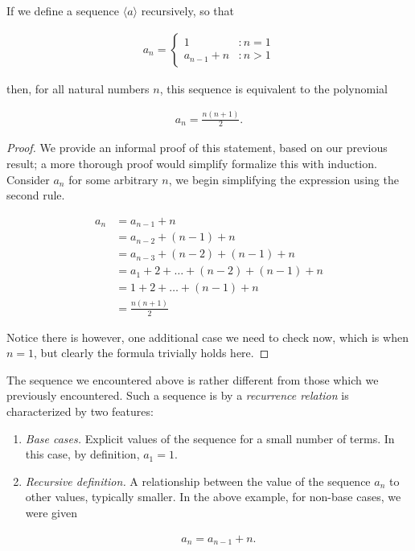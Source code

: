 \documentclass[twoside]{report}
\begin{document}
\vspace{\baselineskip}
\begin{theorem}
	If we define a sequence $\langle a \rangle$ recursively, so that
	
	\begin{align*}
		a_n =
		\begin{cases}
			1 &: n = 1 \\
			a_{n - 1} + n &: n > 1
		\end{cases}
	\end{align*}
	
	then, for all natural numbers $n$, this sequence is equivalent to the polynomial
	
	\begin{align}
		a_n = \frac{n(n + 1)}{2}.
	\end{align}
\end{theorem}
\begin{proof}
	We provide an informal proof of this statement, based on our previous result; a more thorough proof would simplify formalize this with induction. Consider $a_n$ for some arbitrary $n$, we begin simplifying the expression using the second rule.
	
	\begin{align*}
		a_n &= a_{n - 1} + n \\
		&= a_{n - 2} + (n - 1) + n \\
		&= a_{n - 3} + (n - 2) + (n - 1) + n \\
		&= a_1 + 2 + \dots + (n - 2) + (n - 1) + n \\
		&= 1 + 2 + \dots + (n - 1) + n \\
		&= \frac{n (n + 1)}{2}
	\end{align*}
	
	Notice there is however, one additional case we need to check now, which is when $n = 1$, but clearly the formula trivially holds here.
\end{proof}
\vspace{\baselineskip}

The sequence we encountered above is rather different from those which we previously encountered. Such a sequence is by a \emph{recurrence relation} is characterized by two features:

\begin{enumerate}
	\item \emph{Base cases.} Explicit values of the sequence for a small number of terms. In this case, by definition, $a_1 = 1$.
	\item \emph{Recursive definition.} A relationship between the value of the sequence $a_n$ to other values, typically smaller. In the above example, for non-base cases, we were given
	
	\begin{align*}
		a_n = a_{n - 1} + n.
	\end{align*}
\end{enumerate}
\end{document}
